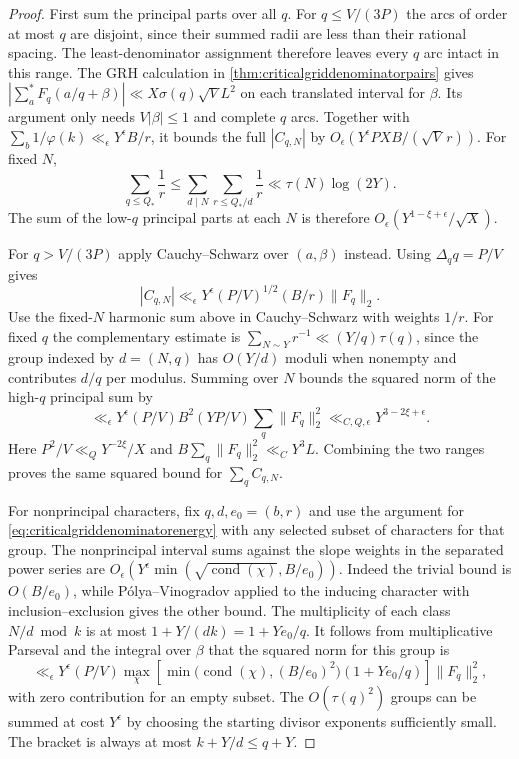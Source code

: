 \documentclass[11pt,a4paper]{article}
\numberwithin{equation}{section}
\begin{document}
\begin{proof}
First sum the principal parts over all $q$. For $q\le V/(3P)$
the arcs of order at most $q$ are disjoint, since their
summed radii are less than their rational spacing.
The least-denominator assignment therefore leaves every
$q$ arc intact in this range. The GRH calculation in
\cref{thm:criticalgriddenominatorpairs} gives
$|\sum_a^* F_q(a/q+\beta)|\ll X\sigma(q)\sqrt V L^2$
on each translated interval for $\beta$. Its argument
only needs $V|\beta|\le1$ and complete $q$ arcs.
Together with $\sum_b1/\varphi(k)\ll_\epsilon Y^\epsilon B/r$,
it bounds the full $|C_{q,N}|$ by
$O_\epsilon(Y^\epsilon PXB/(\sqrt V\,r))$.
For fixed $N$,
\[
 \sum_{q\le Q_*}\frac1r
 \le \sum_{d\mid N}\sum_{r\le Q_*/d}\frac1r
 \ll \tau(N)\log(2Y).
\]
The sum of the low-$q$ principal parts at each $N$ is therefore
$O_\epsilon(Y^{1-\xi+\epsilon}/\sqrt X)$.

For $q>V/(3P)$ apply Cauchy--Schwarz over $(a,\beta)$
instead. Using $\Delta_q q=P/V$ gives
\[
 |C_{q,N}|\ll_\epsilon Y^\epsilon (P/V)^{1/2}
                                     (B/r)\|F_q\|_2 .
\]
Use the fixed-$N$ harmonic sum above in Cauchy--Schwarz with
weights $1/r$. For fixed $q$ the complementary estimate is
$\sum_{N\sim Y}r^{-1}\ll (Y/q)\tau(q)$, since the group indexed
by $d=(N,q)$ has $O(Y/d)$ moduli when nonempty and contributes
$d/q$ per modulus. Summing over $N$ bounds the squared norm of
the high-$q$ principal sum by
\[
 \ll_\epsilon Y^\epsilon (P/V)B^2
                  (YP/V)\sum_q\|F_q\|_2^2
 \ll_{C,Q,\epsilon}Y^{3-2\xi+\epsilon}.
\]
Here $P^2/V\ll_Q Y^{-2\xi}/X$ and
$B\sum_q\|F_q\|_2^2\ll_C Y^3L$. Combining the two ranges
proves the same squared bound for $\sum_q C_{q,N}$.

For nonprincipal characters, fix $q,d,e_0=(b,r)$ and
use the argument for \cref{eq:criticalgriddenominatorenergy}
with any selected subset of characters for that group.
The nonprincipal interval sums against the slope weights
in the separated power series are
$O_\epsilon(Y^\epsilon\min(\sqrt{\operatorname{cond}(\chi)},B/e_0))$.
Indeed the trivial bound is $O(B/e_0)$, while P\'olya--Vinogradov
applied to the inducing character with inclusion--exclusion
gives the other bound. The multiplicity of each class
$N/d\bmod k$ is at most $1+Y/(dk)=1+Y e_0/q$.
It follows from multiplicative Parseval and the integral
over $\beta$ that the squared norm for this group is
\begin{equation}
 \ll_\epsilon Y^\epsilon (P/V)
   \max_{\chi}\left[
      \min\bigl(\operatorname{cond}(\chi),(B/e_0)^2\bigr)
                              (1+Y e_0/q)\right]\|F_q\|_2^2 ,
 \label{eq:criticalgridglobalcomponent}
\end{equation}
with zero contribution for an empty subset. The
$O(\tau(q)^2)$ groups can be summed at cost $Y^\epsilon$
by choosing the starting divisor exponents sufficiently small.
The bracket is always at most $k+Y/d\le q+Y$.


\end{proof}
\end{document}

